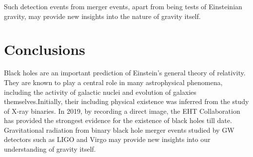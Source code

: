 \documentclass[twocolumn]{aastex63}
\begin{document}
Such detection events from merger events, apart from being tests of Einsteinian gravity, may provide new insights into the nature of gravity itself.

\section{Conclusions}
Black holes are an important prediction of Einstein's general theory of relativity. They are known to play a central role in many astrophysical phenomena, including the activity of galactic nuclei and evolution of galaxies themselves.Initially, their including physical existence was inferred from the study of X-ray binaries. In 2019, by recording a direct image, the EHT Collaboration has provided the strongest evidence for the existence of black holes till date. Gravitational radiation from binary black hole merger events studied by GW detectors such as LIGO and Virgo may provide new insights into our understanding of gravity itself.

{}



\end{document}
